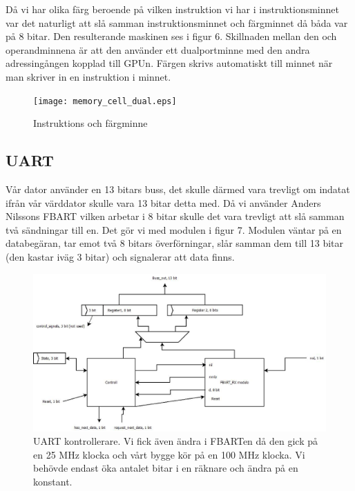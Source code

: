 \documentclass[11pt]{article}
\begin{document}
Då vi har olika färg beroende på vilken instruktion vi har i instruktionsminnet var det naturligt att slå samman instruktionsminnet och färgminnet då båda var på 8 bitar. Den resulterande maskinen ses i figur 6. Skillnaden mellan den och operandminnena är att den använder ett dualportminne med den andra adressingången kopplad till GPUn. Färgen skrivs automatiskt till minnet när man skriver in en instruktion i minnet.

\begin{figure}[h]
    \begin{center}
        \texttt{[image: memory\_cell\_dual.eps]}
        \caption{Instruktions och färgminne}
        \label{fig:memory_cell_dual}
    \end{center}
\end{figure}

\newpage
\subsection{UART}

Vår dator använder en 13 bitars buss, det skulle därmed vara trevligt om indatat ifrån vår värddator skulle vara 13 bitar detta med. Då vi använder Anders Nilssons FBART vilken arbetar i 8 bitar skulle det vara trevligt att slå samman två sändningar till en. Det gör vi med modulen i figur 7. Modulen väntar på en databegäran, tar emot två 8 bitars överförningar, slår samman dem till 13 bitar (den kastar iväg 3 bitar) och signalerar att data finns.

\begin{figure}[h]
    \begin{center}
        \includegraphics[width=13cm]{uart.eps}
        \caption{UART kontrollerare. Vi fick även ändra i FBARTen då den gick på en 25 MHz klocka och vårt bygge kör på en 100 MHz klocka. Vi behövde endast öka antalet bitar i en räknare och ändra på en konstant.}
        \label{fig:uart}
    \end{center}
\end{figure}
\end{document}
